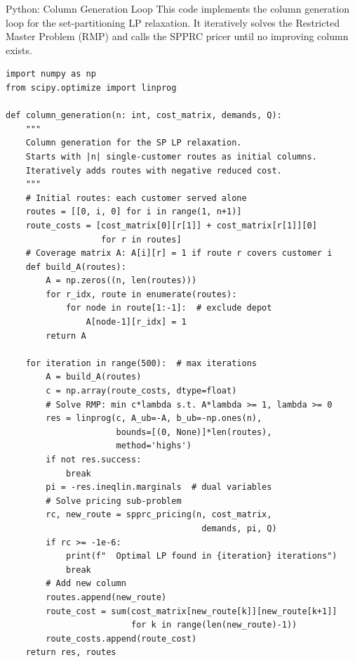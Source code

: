 \documentclass[aspectratio=169,10pt]{beamer}
\begin{document}
\begin{frame}[fragile]{Python: Column Generation Loop}
This code implements the column generation loop for the set-partitioning
LP relaxation. It iteratively solves the Restricted Master Problem (RMP)
and calls the SPPRC pricer until no improving column exists.

\begin{lstlisting}[caption={Column generation for SP LP relaxation (conceptual)}]
import numpy as np
from scipy.optimize import linprog

def column_generation(n: int, cost_matrix, demands, Q):
    """
    Column generation for the SP LP relaxation.
    Starts with |n| single-customer routes as initial columns.
    Iteratively adds routes with negative reduced cost.
    """
    # Initial routes: each customer served alone
    routes = [[0, i, 0] for i in range(1, n+1)]
    route_costs = [cost_matrix[0][r[1]] + cost_matrix[r[1]][0]
                   for r in routes]
    # Coverage matrix A: A[i][r] = 1 if route r covers customer i
    def build_A(routes):
        A = np.zeros((n, len(routes)))
        for r_idx, route in enumerate(routes):
            for node in route[1:-1]:  # exclude depot
                A[node-1][r_idx] = 1
        return A

    for iteration in range(500):  # max iterations
        A = build_A(routes)
        c = np.array(route_costs, dtype=float)
        # Solve RMP: min c*lambda s.t. A*lambda >= 1, lambda >= 0
        res = linprog(c, A_ub=-A, b_ub=-np.ones(n),
                      bounds=[(0, None)]*len(routes),
                      method='highs')
        if not res.success:
            break
        pi = -res.ineqlin.marginals  # dual variables
        # Solve pricing sub-problem
        rc, new_route = spprc_pricing(n, cost_matrix,
                                       demands, pi, Q)
        if rc >= -1e-6:
            print(f"  Optimal LP found in {iteration} iterations")
            break
        # Add new column
        routes.append(new_route)
        route_cost = sum(cost_matrix[new_route[k]][new_route[k+1]]
                         for k in range(len(new_route)-1))
        route_costs.append(route_cost)
    return res, routes
\end{lstlisting}
\end{frame}
\end{document}
